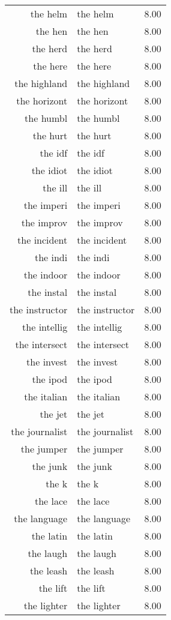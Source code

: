 \begin{table}[ht]
\begin{tabular}{rlr}
  the helm & the helm & 8.00 \\ 
  the hen & the hen & 8.00 \\ 
  the herd & the herd & 8.00 \\ 
  the here & the here & 8.00 \\ 
  the highland & the highland & 8.00 \\ 
  the horizont & the horizont & 8.00 \\ 
  the humbl & the humbl & 8.00 \\ 
  the hurt & the hurt & 8.00 \\ 
  the idf & the idf & 8.00 \\ 
  the idiot & the idiot & 8.00 \\ 
  the ill & the ill & 8.00 \\ 
  the imperi & the imperi & 8.00 \\ 
  the improv & the improv & 8.00 \\ 
  the incident & the incident & 8.00 \\ 
  the indi & the indi & 8.00 \\ 
  the indoor & the indoor & 8.00 \\ 
  the instal & the instal & 8.00 \\ 
  the instructor & the instructor & 8.00 \\ 
  the intellig & the intellig & 8.00 \\ 
  the intersect & the intersect & 8.00 \\ 
  the invest & the invest & 8.00 \\ 
  the ipod & the ipod & 8.00 \\ 
  the italian & the italian & 8.00 \\ 
  the jet & the jet & 8.00 \\ 
  the journalist & the journalist & 8.00 \\ 
  the jumper & the jumper & 8.00 \\ 
  the junk & the junk & 8.00 \\ 
  the k & the k & 8.00 \\ 
  the lace & the lace & 8.00 \\ 
  the language & the language & 8.00 \\ 
  the latin & the latin & 8.00 \\ 
  the laugh & the laugh & 8.00 \\ 
  the leash & the leash & 8.00 \\ 
  the lift & the lift & 8.00 \\ 
  the lighter & the lighter & 8.00 \\ 

\end{tabular}
\end{table}
